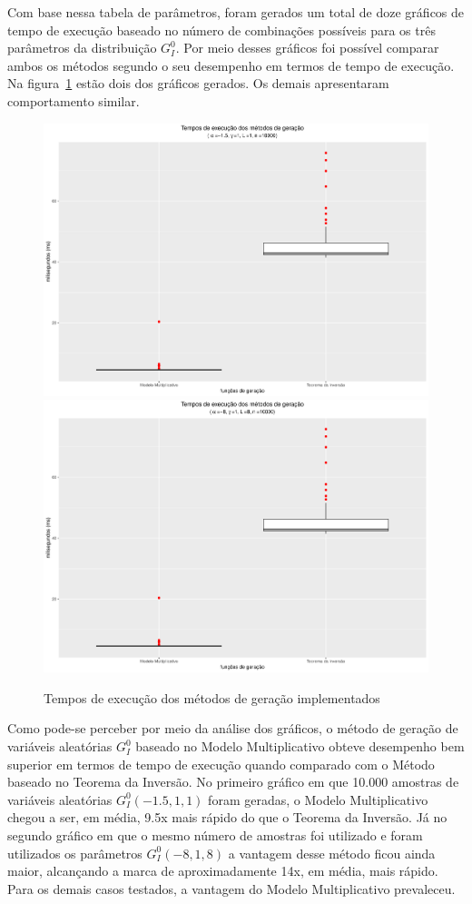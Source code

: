 Com base nessa tabela de parâmetros, foram gerados um total de doze gráficos de tempo de execução baseado no número de combinações possíveis para os três parâmetros da distribuição $G_I^0$. Por meio desses gráficos foi possível comparar ambos os métodos segundo o seu desempenho em termos de tempo de execução. Na figura~\ref{graf_runtimes} estão dois dos gráficos gerados. Os demais apresentaram comportamento similar.
\begin{figure}[H]
     \centering
     \includegraphics[scale=0.45]{plots/Runtime_1.pdf}
     \includegraphics[scale=0.45]{plots/Runtime_2.pdf}
     \caption{Tempos de execução dos métodos de geração implementados}
     \label{graf_runtimes}
\end{figure}

Como pode-se perceber por meio da análise dos gráficos, o método de geração de variáveis aleatórias $G_I^0$ baseado no Modelo Multiplicativo obteve desempenho bem superior em termos de tempo de execução quando comparado com o Método baseado no Teorema da Inversão. No primeiro gráfico em que 10.000 amostras de variáveis aleatórias $G_I^0(-1.5, 1, 1)$ foram geradas, o Modelo Multiplicativo chegou a ser, em média, 9.5x mais rápido do que o Teorema da Inversão. Já no segundo gráfico em que o mesmo número de amostras foi utilizado e foram utilizados os parâmetros $G_I^0(-8, 1, 8)$ a vantagem desse método ficou ainda maior, alcançando a marca de aproximadamente 14x, em média, mais rápido. Para os demais casos testados, a vantagem do Modelo Multiplicativo prevaleceu.

